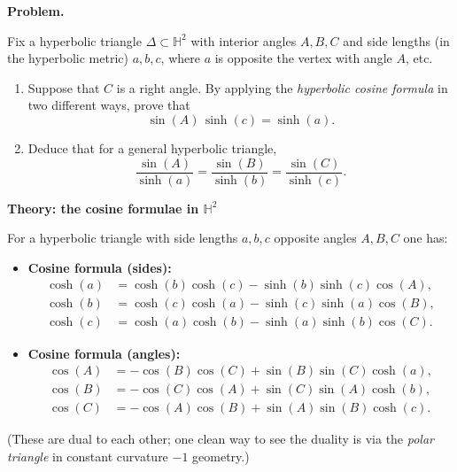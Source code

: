 \begin{problem}
\label{prob:cp-vii-0084}
\par\medskip\noindent\textbf{Problem.}\par\smallskip

		Fix a hyperbolic triangle $\Delta\subset \mathbb{H}^2$ with interior angles $A,B,C$ and side lengths
		(in the hyperbolic metric) $a,b,c$, where $a$ is opposite the vertex with angle $A$, etc.
		\begin{enumerate}
			\item Suppose that $C$ is a right angle. By applying the \emph{hyperbolic cosine formula} in two different ways,
			prove that
			\[
			\sin(A)\,\sinh(c)=\sinh(a).
			\]
			\item Deduce that for a general hyperbolic triangle,
			\[
			\frac{\sin(A)}{\sinh(a)}=\frac{\sin(B)}{\sinh(b)}=\frac{\sin(C)}{\sinh(c)}.
			\]
		\end{enumerate}

	
	\par\medskip\noindent\textbf{Theory: the cosine formulae in $\mathbb{H}^2$}\par\smallskip

	For a hyperbolic triangle with side lengths $a,b,c$ opposite angles $A,B,C$ one has:
	
	\begin{itemize}
		\item \textbf{Cosine formula (sides):}
		\begin{align*}
			\cosh(a)&=\cosh(b)\cosh(c)-\sinh(b)\sinh(c)\cos(A),\\
			\cosh(b)&=\cosh(c)\cosh(a)-\sinh(c)\sinh(a)\cos(B),\\
			\cosh(c)&=\cosh(a)\cosh(b)-\sinh(a)\sinh(b)\cos(C).
		\end{align*}
		
		\item \textbf{Cosine formula (angles):}
		\begin{align*}
			\cos(A)&=-\cos(B)\cos(C)+\sin(B)\sin(C)\cosh(a),\\
			\cos(B)&=-\cos(C)\cos(A)+\sin(C)\sin(A)\cosh(b),\\
			\cos(C)&=-\cos(A)\cos(B)+\sin(A)\sin(B)\cosh(c).
		\end{align*}
	\end{itemize}
	
	(These are dual to each other; one clean way to see the duality is via the \emph{polar triangle}
	in constant curvature $-1$ geometry.)
\end{problem}

